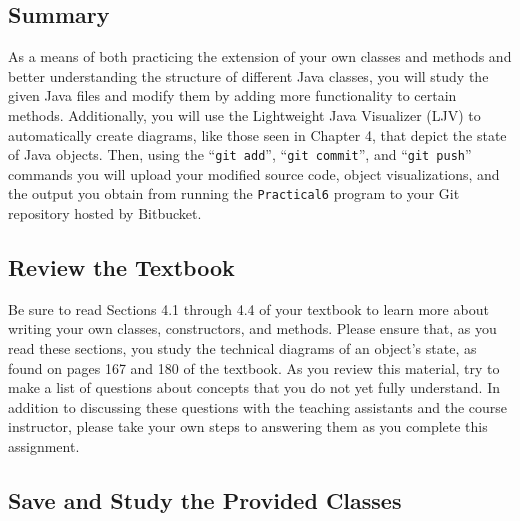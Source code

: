 


\vspace*{-.2in}
\subsection*{Summary}
\vspace*{-.05in}

As a means of both practicing the extension of your own classes and methods and better understanding the structure of
different Java classes, you will study the given Java files and modify them by adding more functionality to certain
methods.  Additionally, you will use the Lightweight Java Visualizer (LJV) to automatically create diagrams, like those
seen in Chapter 4, that depict the state of Java objects.  Then, using the ``{\tt git add}'', ``{\tt git commit}'', and
``{\tt git push}'' commands you will upload your modified source code, object visualizations, and the output you obtain
from running the {\tt Practical6} program to your Git repository hosted by Bitbucket.

\vspace*{-.15in}
\subsection*{Review the Textbook}
\vspace*{-.05in}

Be sure to read Sections 4.1 through 4.4 of your textbook to learn more about writing your own classes, constructors, and
methods.  Please ensure that, as you read these sections, you study the technical diagrams of an object's state, as
found on pages 167 and 180 of the textbook. As you review this material, try to make a list of questions about concepts
that you do not yet fully understand.  In addition to discussing these questions with the teaching assistants and the
course instructor, please take your own steps to answering them as you complete this assignment.

\vspace*{-.15in}
\subsection*{Save and Study the Provided Classes}
\vspace*{-.05in}

